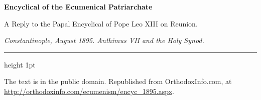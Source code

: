\documentclass[11pt,letterpaper]{article}
\begin{document}
\color{ink}
\begin{center}
{\LARGE\bfseries\color{heading} Encyclical of the Ecumenical Patriarchate\par}
\vspace{1em}
{\large A Reply to the Papal Encyclical of Pope Leo XIII on Reunion.\par}
\vspace{0.6em}
{\itshape\color{subhead} Constantinople, August 1895. Anthimus VII and the Holy Synod.\par}
\vspace{0.4em}
{\color{accent}\hrule height 1pt}
\end{center}
\vspace{1em}



\vspace{2em}
{\small\noindent The text is in the public domain. Republished from OrthodoxInfo.com,
at \url{http://orthodoxinfo.com/ecumenism/encyc_1895.aspx}.\par}
\end{document}
